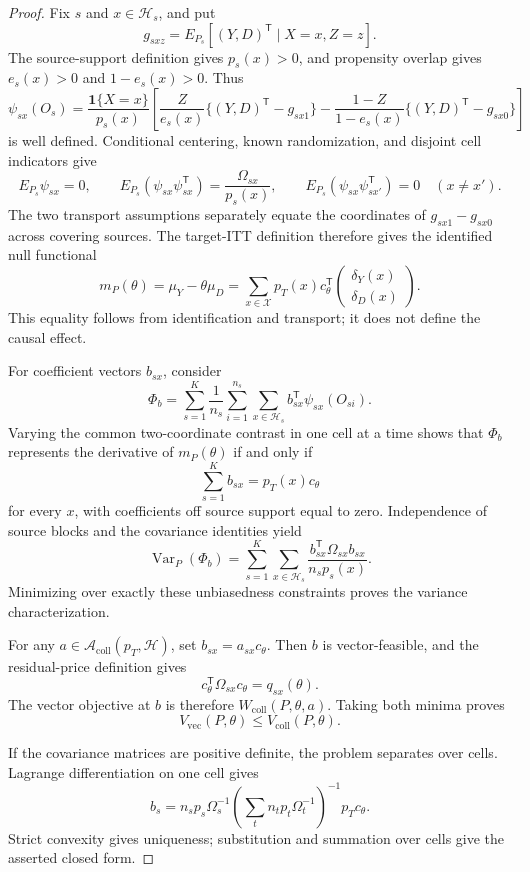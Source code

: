 \documentclass{article}
\begin{document}
\begin{proof}
Fix \(s\) and \(x\in\mathcal H_s\), and put
\[
g_{sxz}=E_{P_s}[(Y,D)^{\mathsf T}\mid X=x,Z=z].
\]
The source-support definition gives \(p_s(x)>0\), and propensity overlap gives \(e_s(x)>0\) and \(1-e_s(x)>0\). Thus
\[
\psi_{sx}(O_s)=\frac{\mathbf 1\{X=x\}}{p_s(x)}
\left[
\frac{Z}{e_s(x)}\{(Y,D)^{\mathsf T}-g_{sx1}\}
-\frac{1-Z}{1-e_s(x)}\{(Y,D)^{\mathsf T}-g_{sx0}\}
\right]
\]
is well defined. Conditional centering, known randomization, and disjoint cell indicators give
\[
E_{P_s}\psi_{sx}=0,\qquad
E_{P_s}(\psi_{sx}\psi_{sx}^{\mathsf T})=\frac{\Omega_{sx}}{p_s(x)},\qquad
E_{P_s}(\psi_{sx}\psi_{sx'}^{\mathsf T})=0\quad(x\ne x').
\]
The two transport assumptions separately equate the coordinates of \(g_{sx1}-g_{sx0}\) across covering sources. The target-ITT definition therefore gives the identified null functional
\[
m_P(\theta)=\mu_Y-\theta\mu_D
=\sum_{x\in\mathcal X}p_T(x)c_\theta^{\mathsf T}
\begin{pmatrix}\delta_Y(x)\\ \delta_D(x)\end{pmatrix}.
\]
This equality follows from identification and transport; it does not define the causal effect.

For coefficient vectors \(b_{sx}\), consider
\[
\Phi_b=\sum_{s=1}^K\frac1{n_s}\sum_{i=1}^{n_s}
\sum_{x\in\mathcal H_s}b_{sx}^{\mathsf T}\psi_{sx}(O_{si}).
\]
Varying the common two-coordinate contrast in one cell at a time shows that \(\Phi_b\) represents the derivative of \(m_P(\theta)\) if and only if
\[
\sum_{s=1}^K b_{sx}=p_T(x)c_\theta
\]
for every \(x\), with coefficients off source support equal to zero. Independence of source blocks and the covariance identities yield
\[
\operatorname{Var}_P(\Phi_b)
=\sum_{s=1}^K\sum_{x\in\mathcal H_s}
\frac{b_{sx}^{\mathsf T}\Omega_{sx}b_{sx}}{n_sp_s(x)}.
\]
Minimizing over exactly these unbiasedness constraints proves the variance characterization.

For any \(a\in\mathcal A_{\mathrm{coll}}(p_T,\mathcal H)\), set \(b_{sx}=a_{sx}c_\theta\). Then \(b\) is vector-feasible, and the residual-price definition gives
\[
c_\theta^{\mathsf T}\Omega_{sx}c_\theta=q_{sx}(\theta).
\]
The vector objective at \(b\) is therefore \(W_{\mathrm{coll}}(P,\theta,a)\). Taking both minima proves
\[
V_{\mathrm{vec}}(P,\theta)\le V_{\mathrm{coll}}(P,\theta).
\]

If the covariance matrices are positive definite, the problem separates over cells. Lagrange differentiation on one cell gives
\[
b_s=n_sp_s\Omega_s^{-1}
\left(\sum_t n_tp_t\Omega_t^{-1}\right)^{-1}p_Tc_\theta.
\]
Strict convexity gives uniqueness; substitution and summation over cells give the asserted closed form.


\end{proof}
\end{document}
